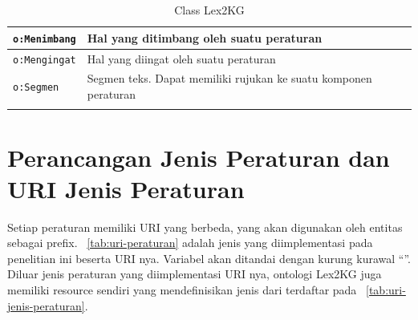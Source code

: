 \begin{longtable}[l]{|p{}|p{}|}
  \texttt{o:Menimbang}      & Hal yang ditimbang oleh suatu peraturan                                                         \\ \hline
  \texttt{o:Mengingat}      & Hal yang diingat oleh suatu peraturan                                                           \\ \hline
  \texttt{o:Segmen}         & Segmen teks. Dapat memiliki rujukan ke suatu komponen peraturan                                 \\ \hline
  \caption{Class Lex2KG}
  \label{tab:class}
\end{longtable}

\section{Perancangan Jenis Peraturan dan URI Jenis Peraturan}
\label{sec:perancangan-jenis-peraturan}

Setiap peraturan memiliki URI yang berbeda, yang akan digunakan oleh entitas sebagai prefix.
\tab~\ref{tab:uri-peraturan} adalah jenis \legal yang diimplementasi pada penelitian ini beserta URI
nya. Variabel akan ditandai dengan kurung kurawal ``\mono{\{\}}''. Diluar jenis peraturan yang
diimplementasi URI nya, ontologi Lex2KG juga memiliki resource sendiri yang mendefinisikan jenis
dari \legal terdaftar pada \tab~\ref{tab:uri-jenis-peraturan}.

